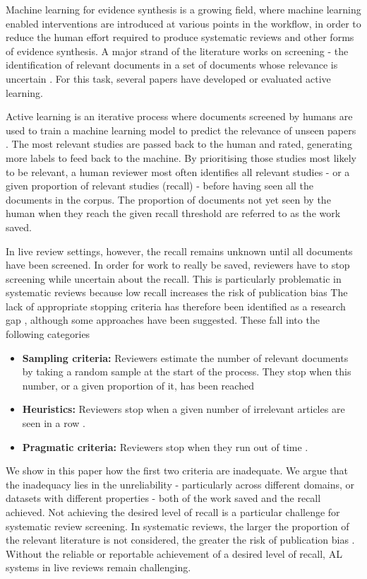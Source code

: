 \documentclass{bmcart}
\begin{document}
	Machine learning for evidence synthesis is a growing field, where machine learning enabled interventions are introduced at various points in the workflow, in order to reduce the human effort required to produce systematic reviews and other forms of evidence synthesis.
	A major strand of the literature works on screening - the identification of relevant documents in a set of documents whose relevance is uncertain \cite{OMara-Eves2015}. 
	For this task, several papers have developed or evaluated active learning. 
	
	Active learning is an iterative process where documents screened by humans are used to train a machine learning model to predict the relevance of unseen papers \cite{Settles2009}.
	The most relevant studies are passed back to the human and rated, generating more labels to feed back to the machine. 
	By prioritising those studies most likely to be relevant, a human reviewer most often identifies all relevant studies - or a given proportion of relevant studies (recall) - before having seen all the documents in the corpus. 
	The proportion of documents not yet seen by the human when they reach the given recall threshold are referred to as the work saved.
	
	In live review settings, however, the recall remains unknown until all documents have been screened. 
	In order for work to really be saved, reviewers have to stop screening while uncertain about the recall. This is particularly problematic in systematic reviews because low recall increases the risk of publication bias %
	The lack of appropriate stopping criteria has therefore been identified as a research gap \cite{bannach-brown2019}, although some approaches have been suggested. These fall into the following categories
	\begin{itemize}
		\item \textbf{Sampling criteria:} Reviewers estimate the number of relevant documents by taking a random sample at the start of the process. They stop when this number, or a given proportion of it, has been reached \cite{Shemilt2014}
		\item \textbf{Heuristics:} Reviewers stop when a given number of irrelevant articles are seen in a row \cite{Przybya2018}. 
		\item \textbf{Pragmatic criteria:} Reviewers stop when they run out of time \cite{miwa2014}. 
	\end{itemize}
	
	We show in this paper how the first two criteria are inadequate.
	We argue that the inadequacy lies in the unreliability - particularly across different domains, or datasets with different properties  - both of the work saved and the recall achieved. Not achieving the desired level of recall is a particular challenge for systematic review screening. In systematic reviews, the larger the proportion of the relevant literature is not considered, the greater the risk of publication bias . 
	Without the reliable or reportable achievement of a desired level of recall, AL systems in live reviews remain challenging.
	
\end{document}
